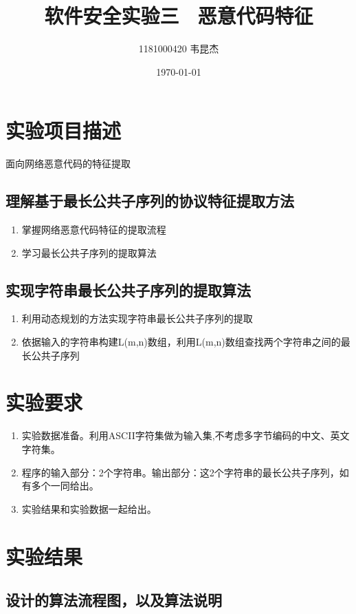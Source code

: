 \documentclass{ctexart}
\title{软件安全实验三 \ 恶意代码特征 }
\author{1181000420 韦昆杰}
\date{\today}
\begin{document}
\maketitle
\tableofcontents

\newpage

\section{实验项目描述}
面向网络恶意代码的特征提取

\subsection{理解基于最长公共子序列的协议特征提取方法}
\begin{enumerate}
  \item 掌握网络恶意代码特征的提取流程
  \item 学习最长公共子序列的提取算法
\end{enumerate}

\subsection{实现字符串最长公共子序列的提取算法}
\begin{enumerate}
  \item 利用动态规划的方法实现字符串最长公共子序列的提取
  \item 依据输入的字符串构建L(m,n)数组，利用L(m,n)数组查找两个字符串之间的最长公共子序列
\end{enumerate}



\section{实验要求}
\begin{enumerate}
  \item 实验数据准备。利用ASCII字符集做为输入集,不考虑多字节编码的中文、英文字符集。
  \item 程序的输入部分：2个字符串。输出部分：这2个字符串的最长公共子序列，如有多个一同给出。
  \item 实验结果和实验数据一起给出。
\end{enumerate}

\section{实验结果}
\subsection{设计的算法流程图，以及算法说明}
\end{document}
